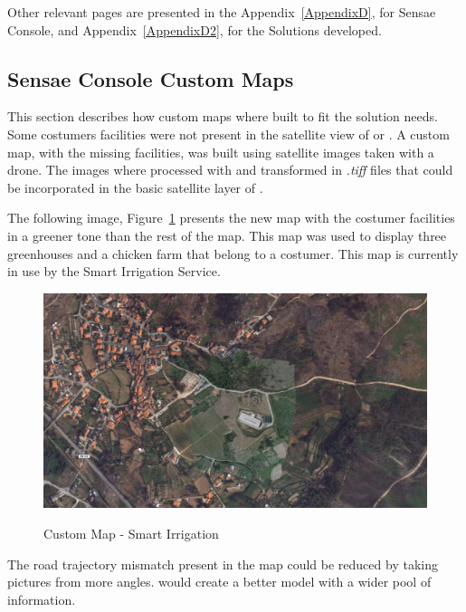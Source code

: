 Other relevant pages are presented in the Appendix~\ref{AppendixD}, for Sensae Console, and Appendix~\ref{AppendixD2}, for the Solutions developed.

\subsection{Sensae Console Custom Maps}
\label{subsec:implementation:description:maps}

This section describes how custom maps where built to fit the solution needs. Some costumers facilities were not present in the satellite view of  or . A custom map, with the missing facilities, was built using satellite images taken with a drone. The images where processed with  and transformed in \textit{.tiff} files that could be incorporated in the basic satellite layer of .

The following image, Figure~\ref{fig:implementation:description:maps:irrig} presents the new map with the costumer facilities in a greener tone than the rest of the map. This map was used to display three greenhouses and a chicken farm that belong to a costumer. This map is currently in use by the Smart Irrigation Service.

\begin{figure}[H]
    \centering
    \resizebox{\columnwidth}{!}
    {
       \includegraphics{assets/figures/maps/custom-map.png}
    }
    \caption[Custom Map - Smart Irrigation]{Custom Map - Smart Irrigation}
    \label{fig:implementation:description:maps:irrig}
\end{figure}

The road trajectory mismatch present in the map could be reduced by taking pictures from more angles.  would create a better model with a wider pool of information.

